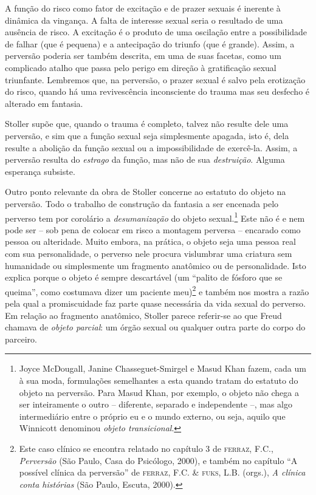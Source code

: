 A função do risco como fator de excitação e de prazer sexuais é inerente
à dinâmica da vingança. A falta de interesse sexual seria o resultado de
uma ausência de risco. A excitação é o produto de uma oscilação entre a
possibilidade de falhar (que é pequena) e a antecipação do triunfo (que
é grande). Assim, a perversão poderia ser também descrita, em uma de
suas facetas, como um complicado atalho que passa pelo perigo em direção
à gratificação sexual triunfante. Lembremos que, na perversão, o prazer
sexual é salvo pela erotização do risco, quando há uma revivescência
inconsciente do trauma mas seu desfecho é alterado em fantasia.

Stoller supõe que, quando o trauma é completo, talvez não resulte dele
uma perversão, e sim que a função sexual seja simplesmente apagada, isto
é, dela resulte a abolição da função sexual ou a impossibilidade de
exercê-la. Assim, a perversão resulta do \emph{estrago} da função, mas
não de sua \emph{destruição}. Alguma esperança subsiste.

Outro ponto relevante da obra de Stoller concerne ao estatuto do objeto
na perversão. Todo o trabalho de construção da fantasia a ser encenada
pelo perverso tem por corolário a \emph{desumanização} do objeto
sexual.\footnote{Joyce McDougall, Janine Chasseguet-Smirgel e Masud Khan
  fazem, cada um à sua moda, formulações semelhantes a esta quando
  tratam do estatuto do objeto na perversão. Para Masud Khan, por
  exemplo, o objeto não chega a ser inteiramente o outro -- diferente,
  separado e independente --, mas algo intermediário entre o próprio eu
  e o mundo externo, ou seja, aquilo que Winnicott denominou
  \emph{objeto transicional}.} Este não é e nem pode ser -- sob pena de
colocar em risco a montagem perversa -- encarado como pessoa ou
alteridade. Muito embora, na prática, o objeto seja uma pessoa real com
sua personalidade, o perverso nele procura vislumbrar uma criatura sem
humanidade ou simplesmente um fragmento anatômico ou de personalidade.
Isto explica porque o objeto é sempre descartável (um ``palito de
fósforo que se queima'', como costumava dizer um paciente meu)\footnote{Este
  caso clínico se encontra relatado no capítulo 3 de \textsc{ferraz},
  F.C., \emph{Perversão} (São Paulo, Casa do Psicólogo, 2000), e também
  no capítulo ``A possível clínica da perversão'' de \textsc{ferraz},
  F.C. \& \textsc{fuks}, L.B. (orgs.), \emph{A clínica conta histórias}
  (São Paulo, Escuta, 2000).} e também nos mostra a razão pela qual a
promiscuidade faz parte quase necessária da vida sexual do perverso. Em
relação ao fragmento anatômico, Stoller parece referir-se ao que Freud
chamava de \emph{objeto parcial}: um órgão sexual ou qualquer outra
parte do corpo do parceiro.

